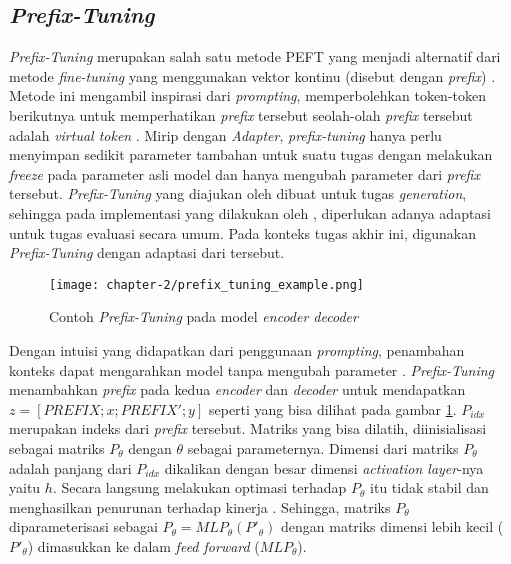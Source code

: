 \subsection{\textit{Prefix-Tuning}}
\label{sec:prefix-tuning}

\textit{Prefix-Tuning} merupakan salah satu metode PEFT yang menjadi alternatif dari metode \textit{fine-tuning} yang menggunakan vektor kontinu (disebut dengan \textit{prefix}) \parencite{prefix_tuning}. Metode ini mengambil inspirasi dari \textit{prompting}, memperbolehkan token-token berikutnya untuk memperhatikan \textit{prefix} tersebut seolah-olah \textit{prefix} tersebut adalah \textit{virtual token} \parencite{prefix_tuning}. Mirip dengan \textit{Adapter}, \textit{prefix-tuning} hanya perlu menyimpan sedikit parameter tambahan untuk suatu tugas dengan melakukan \textit{freeze} pada parameter asli model dan hanya mengubah parameter dari \textit{prefix} tersebut. \textit{Prefix-Tuning} yang diajukan oleh \citeauthor{prefix_tuning} dibuat untuk tugas \textit{generation}, sehingga pada implementasi yang dilakukan oleh \citeauthor{adapters}, diperlukan adanya adaptasi untuk tugas evaluasi secara umum. Pada konteks tugas akhir ini, digunakan \textit{Prefix-Tuning} dengan adaptasi dari \citeauthor{adapters} tersebut. 

\begin{figure}[h]
    \vspace{0.25cm}
    \centering
    \texttt{[image: chapter-2/prefix\_tuning\_example.png]}
    \caption{Contoh \textit{Prefix-Tuning} pada model \textit{encoder decoder} \parencite{prefix_tuning}}
    \label{fig:prefix_tuning_example}
\end{figure}

Dengan intuisi yang didapatkan dari penggunaan \textit{prompting}, penambahan konteks dapat mengarahkan model tanpa mengubah parameter \parencite{prefix_tuning}. \textit{Prefix-Tuning} menambahkan \textit{prefix} pada kedua \textit{encoder} dan \textit{decoder} untuk mendapatkan $z = [PREFIX;x;PREFIX';y]$ seperti yang bisa dilihat pada gambar \ref{fig:prefix_tuning_example}. $P_{idx}$ merupakan indeks dari \textit{prefix} tersebut. Matriks yang bisa dilatih, diinisialisasi sebagai matriks $P_\theta$ dengan $\theta$ sebagai parameternya. Dimensi dari matriks $P_\theta$ adalah panjang dari $P_{idx}$ dikalikan dengan besar dimensi \textit{activation layer}-nya yaitu $h$. Secara langsung melakukan optimasi terhadap $P_\theta$ itu tidak stabil dan menghasilkan penurunan terhadap kinerja \parencite{prefix_tuning}. Sehingga, matriks $P_\theta$ diparameterisasi sebagai $P_\theta = MLP_\theta(P'_\theta)$ dengan matriks dimensi lebih kecil ($P'_\theta$) dimasukkan ke dalam \textit{feed forward} ($MLP_\theta$).


